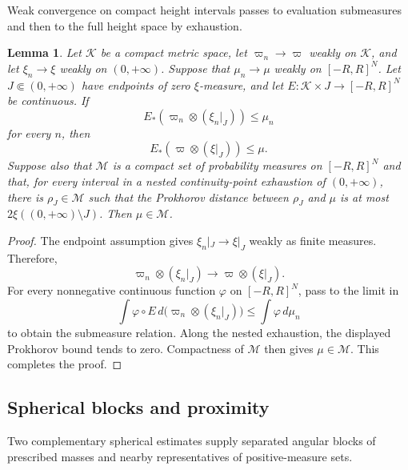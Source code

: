 \documentclass{amsart}
\numberwithin{equation}{section}
\theoremstyle{plain}
\newtheorem{lemma}[theorem]{Lemma}
\theoremstyle{definition}
\theoremstyle{remark}
\begin{document}
Weak convergence on compact height intervals passes to evaluation submeasures and then to the full height space by exhaustion.

\begin{lemma}\label{lem:compact-profile-passage}
Let $\mathscr K$ be a compact metric space, let $\varpi_n\to\varpi$ weakly on $\mathscr K$, and let $\xi_n\to\xi$ weakly on $(0,+\infty)$.  Suppose that $\mu_n\to\mu$ weakly on $[-R,R]^N$.  Let $J\Subset(0,+\infty)$ have endpoints of zero $\xi$-measure, and let $E\colon\mathscr K\times J\to[-R,R]^N$ be continuous.  If
\[ E_*(\varpi_n\otimes(\xi_n|_J))\le\mu_n \]
for every $n$, then
\[ E_*(\varpi\otimes(\xi|_J))\le\mu. \]
Suppose also that $\mathscr M$ is a compact set of probability measures on $[-R,R]^N$ and that, for every interval in a nested continuity-point exhaustion of $(0,+\infty)$, there is $\rho_J\in\mathscr M$ such that
the Prokhorov distance between $\rho_J$ and $\mu$ is at most
$2\xi((0,+\infty)\setminus J)$.
Then $\mu\in\mathscr M$.
\end{lemma}

\begin{proof}
The endpoint assumption gives $\xi_n|_J\to\xi|_J$ weakly as finite measures.  Therefore,
\[ \varpi_n\otimes(\xi_n|_J) \longrightarrow\varpi\otimes(\xi|_J). \]
For every nonnegative continuous function $\varphi$ on $[-R,R]^N$, pass to the limit in
\[ \int\varphi\circ E\,d\bigl(\varpi_n\otimes(\xi_n|_J)\bigr) \le\int\varphi\,d\mu_n \]
to obtain the submeasure relation.  Along the nested exhaustion, the displayed Prokhorov bound tends to zero.  Compactness of $\mathscr M$ then gives $\mu\in\mathscr M$.
	This completes the proof.
\end{proof}

\subsection{Spherical blocks and proximity}

Two complementary spherical estimates supply separated angular blocks of prescribed masses and nearby representatives of positive-measure sets.
\end{document}
